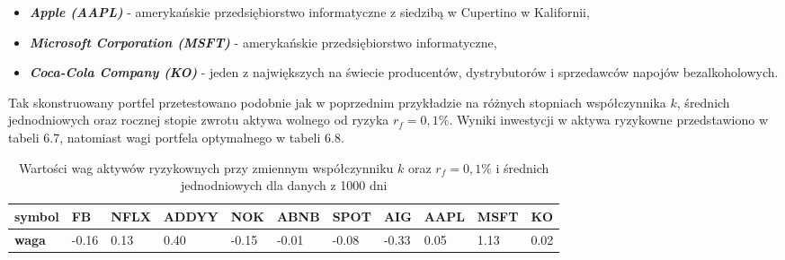 \documentclass[magister]{dyplom}
\begin{document}
\begin{itemize}
	\item \textit{\textbf{Apple (AAPL)}} - amerykańskie przedsiębiorstwo informatyczne z siedzibą w Cupertino w Kalifornii,\cite{apple}
	\item \textit{\textbf{Microsoft Corporation (MSFT)}} - amerykańskie przedsiębiorstwo informatyczne,\cite{microsoft}
	\item \textit{\textbf{Coca-Cola Company (KO)}} -  jeden z największych na świecie producentów, dystrybutorów i sprzedawców napojów bezalkoholowych.\cite{coke}
\end{itemize}

Tak skonstruowany portfel przetestowano podobnie jak w poprzednim przykładzie na różnych stopniach współczynnika $k$, średnich jednodniowych oraz rocznej stopie zwrotu aktywa wolnego od ryzyka $r_f = 0,1\%$.
Wyniki inwestycji w aktywa ryzykowne przedstawiono w tabeli 6.7, natomiast wagi portfela optymalnego w tabeli 6.8.

\begin{table}[ht]
	\centering
	\caption{Wartości wag aktywów ryzykownych przy zmiennym współczynniku $k$ oraz $r_f = 0,1\%$ i średnich jednodniowych dla danych z 1000 dni}
	\begin{tabular}{|l|l|l|l|l|l|l|l|l|l|l|}
		\hline
		\textbf{symbol} & \textbf{FB} & \textbf{NFLX} & \textbf{ADDYY} & \textbf{NOK} & \textbf{ABNB} & \textbf{SPOT} & \textbf{AIG} & \textbf{AAPL} & \textbf{MSFT} & \textbf{KO} \\ \hline
		\textbf{waga}   & -0.16       & 0.13          & 0.40           & -0.15        & -0.01         & -0.08         & -0.33        & 0.05          & 1.13          & 0.02        \\ \hline
	\end{tabular}
\end{table}
\end{document}
